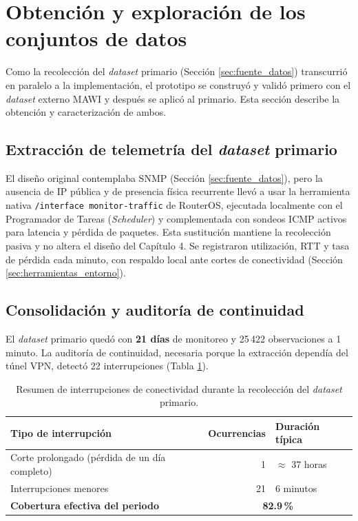 \documentclass[12pt]{report}
\begin{document}
\section{Obtención y exploración de los conjuntos de datos}
\label{sec:obtencion_exploracion}

Como la recolección del \textit{dataset} primario (Sección \ref{sec:fuente_datos}) transcurrió en paralelo a la implementación, el prototipo se construyó y validó primero con el \textit{dataset} externo MAWI y después se aplicó al primario. Esta sección describe la obtención y caracterización de ambos.

\subsection*{Extracción de telemetría del \textit{dataset} primario}

El diseño original contemplaba SNMP (Sección \ref{sec:fuente_datos}), pero la ausencia de IP pública y de presencia física recurrente llevó a usar la herramienta nativa \texttt{/interface monitor-traffic} de RouterOS, ejecutada localmente con el Programador de Tareas (\textit{Scheduler}) y complementada con sondeos ICMP activos para latencia y pérdida de paquetes. Esta sustitución mantiene la recolección pasiva y no altera el diseño del Capítulo 4. Se registraron utilización, RTT y tasa de pérdida cada minuto, con respaldo local ante cortes de conectividad (Sección \ref{sec:herramientas_entorno}).

\subsection*{Consolidación y auditoría de continuidad}

El \textit{dataset} primario quedó con \textbf{21 días} de monitoreo y 25\,422 observaciones a 1 minuto. La auditoría de continuidad, necesaria porque la extracción dependía del túnel VPN, detectó 22 interrupciones (Tabla \ref{tab:huecos_recoleccion}).

\begin{table}[H]
    \centering
    \begin{tabular}{|l|r|l|}
        \hline
        \textbf{Tipo de interrupción} & \textbf{Ocurrencias} & \textbf{Duración típica} \\
        \hline
        Corte prolongado (pérdida de un día completo) & 1 & $\approx$ 37 horas \\
        Interrupciones menores & 21 & 6 minutos \\
        \hline
        \textbf{Cobertura efectiva del periodo} & \multicolumn{2}{c|}{\textbf{82.9\,\%}} \\
        \hline
    \end{tabular}
    \caption{Resumen de interrupciones de conectividad durante la recolección del \textit{dataset} primario.}
    \label{tab:huecos_recoleccion}
\end{table}
\end{document}
